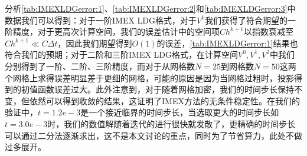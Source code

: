 分析\autoref{tab:IMEXLDGerror:1}、\autoref{tab:IMEXLDGerror:2}和\autoref{tab:IMEXLDGerror:3}中数据我们可以得到：对于一阶IMEX LDG格式，对于$V^1$我们获得了符合期望的一阶精度，对于更高次计算空间，我们的误差估计中的空间项$Ch^{k+1}$以指数衰减至$Ch^{k+1} \ll C\Delta t$，因此我们期望得到$O(1)$的误差，\autoref{tab:IMEXLDGerror:1}结果也符合我们的预期；对于二阶和三阶IMEX LDG格式，在计算空间$V^0, V^1, V^2$中我们分别得到了一阶、二阶、三阶精度，而对于从网格数$N=25$到网格数$N=50$这两个网格上求得误差明显差于更细的网格，可能的原因是因为当网格过粗时，投影得到的初值函数误差过大。此外注意到，对于随着网格加密，我们的时间步长保持不变，但依然可以得到收敛的结果，这证明了IMEX方法的无条件稳定性。在我们的验证中，$t=1.2e-3$是一个接近临界的时间步长，当选取更大的时间步长如$t=3.0e-3$时，我们的数值解随着迭代的进行很快就发散了，更精确的时间步长可以通过二分法逐渐求出，这不是本文讨论的重点，同时为了节省算力，此处不做过多展开。
